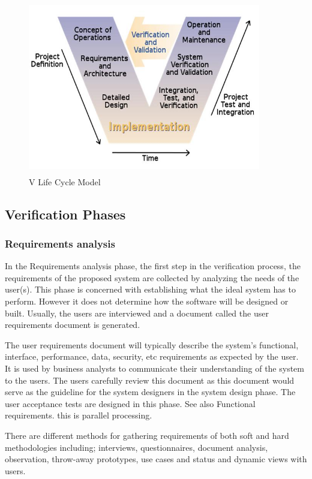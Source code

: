 \documentclass[a4paper,14pt,onecolumn]{article}
\begin{document}
\begin{figure}[h]
\begin{center}
\includegraphics[height=3in,width=4in]
{vcycle.jpg}  
\caption{V Life Cycle Model}
\end{center}
\end{figure}

\subsection{Verification Phases}
\subsubsection{Requirements analysis}
\begin{sloppypar}
In the Requirements analysis phase, the first step in the verification process, the requirements of the proposed system are collected by analyzing the needs of the user(s). This phase is concerned with establishing what the ideal system has to perform. However it does not determine how the software will be designed or built. Usually, the users are interviewed and a document called the user requirements document is generated.
\end{sloppypar}
\begin{sloppypar}
The user requirements document will typically describe the system’s functional, interface, performance, data, security, etc requirements as expected by the user. It is used by business analysts to communicate their understanding of the system to the users. The users carefully review this document as this document would serve as the guideline for the system designers in the system design phase. The user acceptance tests are designed in this phase. See also Functional requirements. this is parallel processing.\end{sloppypar}
\begin{sloppypar}
There are different methods for gathering requirements of both soft and hard methodologies including; interviews, questionnaires, document analysis, observation, throw-away prototypes, use cases and status and dynamic views with users.\end{sloppypar}
\end{document}
